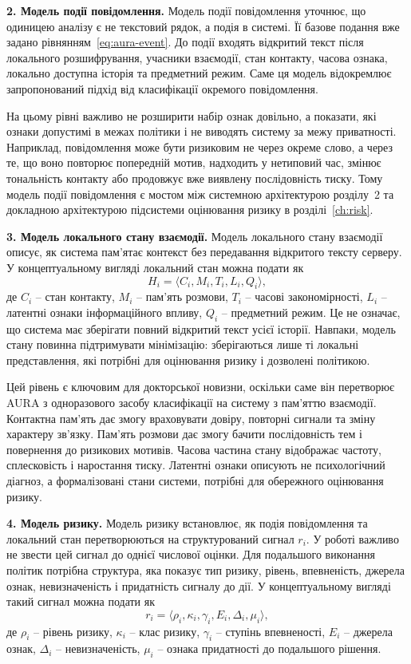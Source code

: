 \textbf{2. Модель події повідомлення.}
Модель події повідомлення уточнює, що одиницею аналізу є не текстовий рядок, а подія в системі. Її базове подання вже задано рівнянням~\eqref{eq:aura-event}. До події входять відкритий текст після локального розшифрування, учасники взаємодії, стан контакту, часова ознака, локально доступна історія та предметний режим. Саме ця модель відокремлює запропонований підхід від класифікації окремого повідомлення.

На цьому рівні важливо не розширити набір ознак довільно, а показати, які ознаки допустимі в межах політики і не виводять систему за межу приватності. Наприклад, повідомлення може бути ризиковим не через окреме слово, а через те, що воно повторює попередній мотив, надходить у нетиповий час, змінює тональність контакту або продовжує вже виявлену послідовність тиску. Тому модель події повідомлення є мостом між системною архітектурою розділу~2 та докладною архітектурою підсистеми оцінювання ризику в розділі~\ref{ch:risk}.

\textbf{3. Модель локального стану взаємодії.}
Модель локального стану взаємодії описує, як система пам'ятає контекст без передавання відкритого тексту серверу. У концептуальному вигляді локальний стан можна подати як
\begin{equation}
  H_i = \langle C_i, M_i, T_i, L_i, Q_i \rangle,
  \label{eq:local-state}
\end{equation}
де \(C_i\) -- стан контакту, \(M_i\) -- пам'ять розмови, \(T_i\) -- часові закономірності, \(L_i\) -- латентні ознаки інформаційного впливу, \(Q_i\) -- предметний режим. Це не означає, що система має зберігати повний відкритий текст усієї історії. Навпаки, модель стану повинна підтримувати мінімізацію: зберігаються лише ті локальні представлення, які потрібні для оцінювання ризику і дозволені політикою.

Цей рівень є ключовим для докторської новизни, оскільки саме він перетворює AURA з одноразового засобу класифікації на систему з пам'яттю взаємодії. Контактна пам'ять дає змогу враховувати довіру, повторні сигнали та зміну характеру зв'язку. Пам'ять розмови дає змогу бачити послідовність тем і повернення до ризикових мотивів. Часова частина стану відображає частоту, сплесковість і наростання тиску. Латентні ознаки описують не психологічний діагноз, а формалізовані стани системи, потрібні для обережного оцінювання ризику.

\textbf{4. Модель ризику.}
Модель ризику встановлює, як подія повідомлення та локальний стан перетворюються на структурований сигнал \(r_i\). У роботі важливо не звести цей сигнал до однієї числової оцінки. Для подальшого виконання політик потрібна структура, яка показує тип ризику, рівень, впевненість, джерела ознак, невизначеність і придатність сигналу до дії. У концептуальному вигляді такий сигнал можна подати як
\begin{equation}
  r_i =
  \langle \rho_i, \kappa_i, \gamma_i, E_i, \Delta_i, \mu_i \rangle,
  \label{eq:risk-signal-structure}
\end{equation}
де \(\rho_i\) -- рівень ризику, \(\kappa_i\) -- клас ризику, \(\gamma_i\) -- ступінь впевненості, \(E_i\) -- джерела ознак, \(\Delta_i\) -- невизначеність, \(\mu_i\) -- ознака придатності до подальшого рішення.

